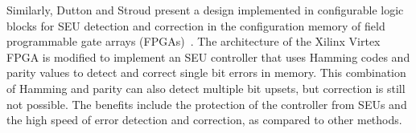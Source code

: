 Similarly, Dutton and Stroud present a design implemented in configurable logic blocks for SEU detection and correction in the configuration memory of field programmable gate arrays (FPGAs)~\cite{CATA09seuonVirtex}.
The architecture of the Xilinx Virtex FPGA is modified to implement an SEU controller that uses Hamming codes and parity values to detect and correct single bit errors in memory.
This combination of Hamming and parity can also detect multiple bit upsets, but correction is still not possible.
The benefits include the protection of the controller from SEUs and the high speed of error detection and correction, as compared to other methods.
